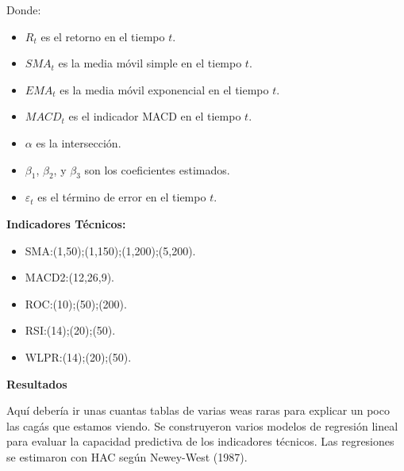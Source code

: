\documentclass[a0,portrait]{a0poster}
\newcommand{\customsection}[1]{
    \begin{center}
        \begin{tcolorbox}[colframe=miRojo!50, colback=miRojo!30, width=\linewidth, boxrule=1mm, arc=3mm, auto outer arc]
            \begin{center}
            \vspace{.5cm} %
            \color{black}
            \textbf{\Huge #1}
            \color{miRojo}
            \vspace{.5cm} %
            \end{center}
        \end{tcolorbox}
    \end{center}
}
\begin{document}
\begin{multicols}{2}
    Donde:
    \begin{itemize}
        \item $R_t$ es el retorno en el tiempo $t$.
        \item $SMA_t$ es la media móvil simple en el tiempo $t$.
        \item $EMA_t$ es la media móvil exponencial en el tiempo $t$.
        \item $MACD_t$ es el indicador MACD en el tiempo $t$.
        \item $\alpha$ es la intersección.
        \item $\beta_1$, $\beta_2$, y $\beta_3$ son los coeficientes estimados.
        \item $\varepsilon_t$ es el término de error en el tiempo $t$.
    \end{itemize}
    \par
    \textbf{Indicadores Técnicos:}
    \begin{itemize}
        \item SMA:(1,50);(1,150);(1,200);(5,200).
        \item MACD2:(12,26,9).
        \item ROC:(10);(50);(200).
        \item RSI:(14);(20);(50).
        \item WLPR:(14);(20);(50).
    \end{itemize}
    \customsection{Resultados}
    \par  
    Aquí debería ir unas cuantas tablas de varias weas raras para explicar un poco las cagás que estamos viendo.
    Se construyeron varios modelos de regresión lineal para evaluar la capacidad predictiva de los indicadores técnicos. Las regresiones se estimaron con HAC según Newey-West (1987).
    


\end{multicols}
\end{document}
